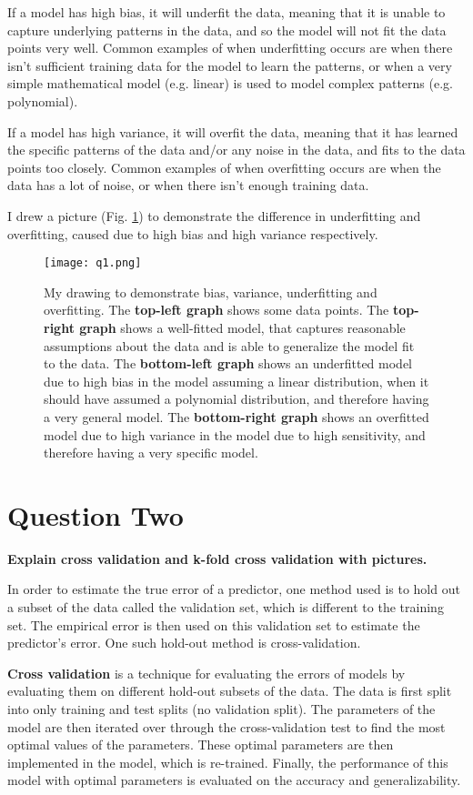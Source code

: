 \documentclass{article}
\begin{document}
If a model has high bias, it will underfit the data, meaning that it is unable to capture underlying patterns in the data, and so the model will not fit the data points very well. Common examples of when underfitting occurs are when there isn't sufficient training data for the model to learn the patterns, or when a very simple mathematical model (e.g. linear) is used to model complex patterns (e.g. polynomial).

If a model has high variance, it will overfit the data, meaning that it has learned the specific patterns of the data and/or any noise in the data, and fits to the data points too closely. Common examples of when overfitting occurs are when the data has a lot of noise, or when there isn't enough training data.

I drew a picture (Fig. \ref{fig1}) to demonstrate the difference in underfitting and overfitting, caused due to high bias and high variance respectively.

\begin{figure}
    \centering
    \texttt{[image: q1.png]}
    \caption{My drawing to demonstrate bias, variance, underfitting and overfitting. The \textbf{top-left graph} shows some data points. The \textbf{top-right graph} shows a well-fitted model, that captures reasonable assumptions about the data and is able to generalize the model fit to the data. The \textbf{bottom-left graph} shows an underfitted model due to high bias in the model assuming a linear distribution, when it should have assumed a polynomial distribution, and therefore having a very general model. The \textbf{bottom-right graph} shows an overfitted model due to high variance in the model due to high sensitivity, and therefore having a very specific model.}
    \label{fig1}
\end{figure}


\section{Question Two}
\noindent \textbf{Explain cross validation and k-fold cross validation with pictures.}

In order to estimate the true error of a predictor, one method used is to hold out a subset of the data called the validation set, which is different to the training set. The empirical error is then used on this validation set to estimate the predictor's error. One such hold-out method is cross-validation.

\textbf{Cross validation} is a technique for evaluating the errors of models by evaluating them on different hold-out subsets of the data. The data is first split into only training and test splits (no validation split). The parameters of the model are then iterated over through the cross-validation test to find the most optimal values of the parameters. These optimal parameters are then implemented in the model, which is re-trained. Finally, the performance of this model with optimal parameters is evaluated on the accuracy and generalizability. 
\end{document}
